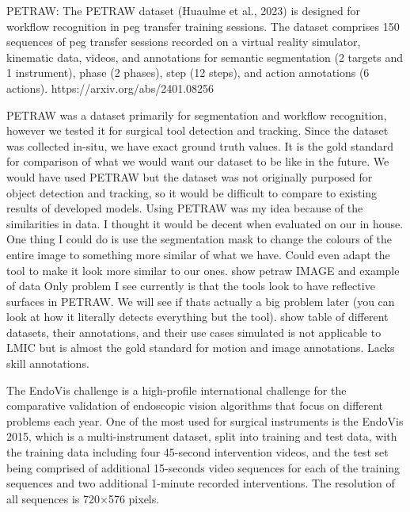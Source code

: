 PETRAW: The PETRAW dataset (Huaulme et al., 2023) is designed for workflow recognition in peg transfer training sessions. The dataset comprises 150 sequences of peg transfer sessions recorded on a virtual reality simulator, kinematic data, videos, and annotations for semantic segmentation (2 targets and 1 instrument), phase (2 phases), step (12 steps), and action annotations (6 actions). https://arxiv.org/abs/2401.08256

PETRAW was a dataset primarily for segmentation and workflow recognition, however we tested it for surgical tool detection and tracking. Since the dataset was collected in-situ, we have exact ground truth values. It is the gold standard for comparison of what we would want our dataset to be like in the future.
We would have used PETRAW but the dataset was not originally purposed for object detection and tracking, so it would be difficult to compare to existing results of developed models.
Using PETRAW was my idea because of the similarities in data. I thought it would be decent when evaluated on our in house. One thing I could do is use the segmentation mask to change the colours of the entire image to something more similar of what we have. Could even adapt the tool to make it look more similar to our ones.
show petraw IMAGE and example of data
Only problem I see currently is that the tools look to have reflective surfaces in PETRAW. We will see if thats actually a big problem later (you can look at how it literally detects everything but the tool).
show table of different datasets, their annotations, and their use cases
simulated is not applicable to LMIC but is almost the gold standard for motion and image annotations. Lacks skill annotations.


The EndoVis challenge is a high-profile international challenge for the comparative validation of endoscopic vision algorithms that focus on different problems each year. One of the most used for surgical instruments is the EndoVis 2015, which is a multi-instrument dataset, split into training and test data, with the training data including four 45-second intervention videos, and the test set being comprised of additional 15-seconds video sequences for each of the training sequences and two additional 1-minute recorded interventions. The resolution of all sequences is 720×576 pixels. 

